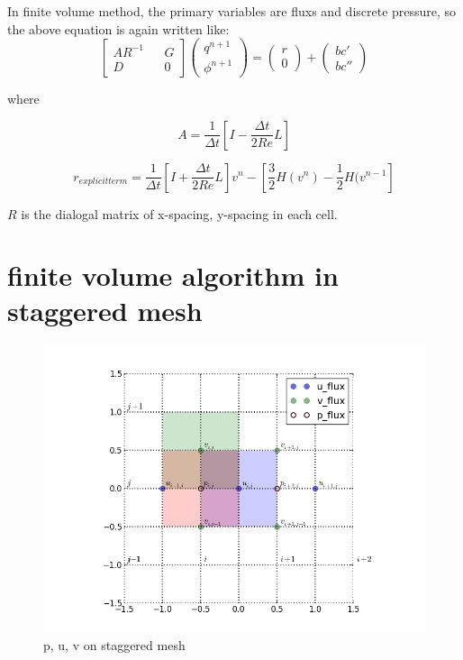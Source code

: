\documentclass[11pt]{article}
\begin{document}
In finite volume method, the primary variables are fluxs and discrete pressure, so the above equation is again written like:
$$ 
\begin{bmatrix} AR^{-1} && G \\ D && 0 \end{bmatrix} \begin{pmatrix} q^{n+1} \\ \phi ^{n+1} \end{pmatrix} = \left( \begin{array}{c} r \\ 0 \end{array} \right) + \left ( \begin{array}{c} bc' \\ bc'' \end{array} \right) $$

where

$$ A = \frac{1}{\Delta t} [ I - \frac{\Delta t}{2Re}L] $$

$$ r_{explicit term} = \frac{1}{\Delta t} [ I + \frac{\Delta t}{2Re} L] v^n - [\frac{3}{2} H(v^n) - \frac{1}{2} H(v^{n-1}] $$

$R$ is the dialogal matrix of x-spacing, y-spacing in each cell.

\section{finite volume algorithm in staggered mesh}

\begin{figure}[!h]
	\caption{p, u, v on staggered mesh}
	\centering
	\includegraphics{staggeredmesh}
\end{figure}
\end{document}
